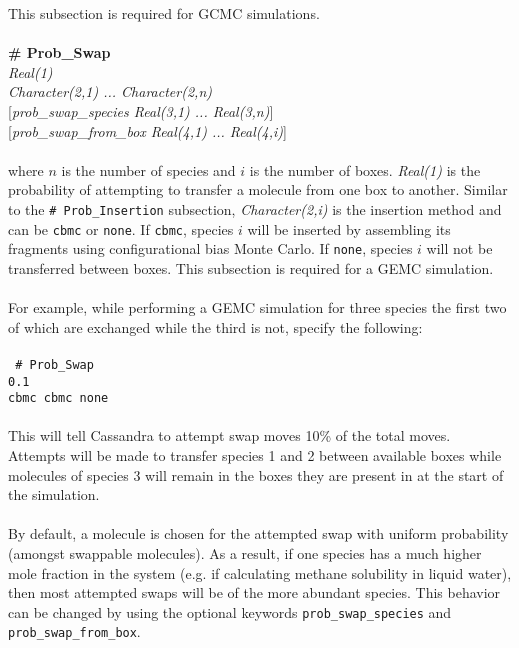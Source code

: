This subsection is required for GCMC simulations. \\ \\
%
%
%
{\bf \# Prob\_Swap}\\
{\it Real(1)} \\ 
{\it Character(2,1) ... Character(2,n)} \\
{[}{\it prob\_swap\_species Real(3,1) ... Real(3,n)}] \\
{[}{\it prob\_swap\_from\_box Real(4,1) ... Real(4,i)}] \\ \\
%
where $n$ is the number of species and $i$ is the number of boxes.
{\em Real(1)} is the probability of attempting to transfer a molecule from one box to another. 
Similar to the \texttt{\# Prob\_Insertion} subsection, 
{\em Character(2,i)} is the insertion method and can be \texttt{cbmc} or \texttt{none}. 
If \texttt{cbmc}, species $i$ will be inserted by assembling its 
fragments using configurational bias Monte Carlo.
If \texttt{none}, species $i$ will not be transferred between boxes.
This subsection is required for a GEMC simulation. \\ \\
%
For example, while performing a GEMC simulation for three species the first two of which are exchanged
while the third is not, specify the following: \\ \\
%
\texttt{ \# Prob\_Swap\\
0.1 \\ 
cbmc cbmc none \\ \\
}
%
This will tell Cassandra to attempt swap moves 10\% of the total moves. 
Attempts will be made to transfer species 1 and 2 between available boxes while molecules 
of species 3 will remain in the boxes they are present in at the start of the simulation. \\ \\
%
By default, a molecule is chosen for the attempted swap with uniform probability 
(amongst swappable molecules).
As a result, if one species has a much higher mole fraction in the system 
(e.g. if calculating methane solubility in liquid water),
then most attempted swaps will be of the more abundant species.
This behavior can be changed by using the optional keywords 
{\tt prob\_swap\_species} and {\tt prob\_swap\_from\_box}. \\ \\
